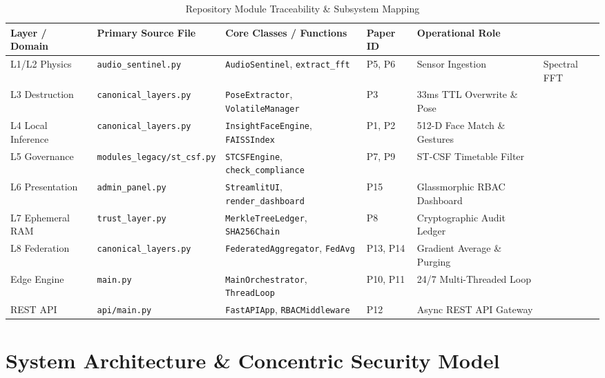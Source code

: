 \documentclass[12pt,a4paper,oneside]{report}
\begin{document}
\begin{table}[htbp]
\caption{Repository Module Traceability & Subsystem Mapping}
\label{tab:codebase_traceability}
\centering
{}
\fontsize{9}{11}\selectfont
\begin{tabular}{@{}lllll@{}}
\toprule
\textbf{Layer / Domain} & \textbf{Primary Source File} & \textbf{Core Classes / Functions} & \textbf{Paper ID} & \textbf{Operational Role} \\
\midrule
L1/L2 Physics & \texttt{audio\_sentinel.py} & \texttt{AudioSentinel}, \texttt{extract\_fft} & P5, P6 & Sensor Ingestion & Spectral FFT \\
L3 Destruction & \texttt{canonical_layers.py} & \texttt{PoseExtractor}, \texttt{VolatileManager} & P3 & 33ms TTL Overwrite \& Pose \\
L4 Local Inference & \texttt{canonical_layers.py} & \texttt{InsightFaceEngine}, \texttt{FAISSIndex} & P1, P2 & 512-D Face Match \& Gestures \\
L5 Governance & \texttt{modules_legacy/st_csf.py} & \texttt{STCSFEngine}, \texttt{check\_compliance} & P7, P9 & ST-CSF Timetable Filter \\
L6 Presentation & \texttt{admin_panel.py} & \texttt{StreamlitUI}, \texttt{render_dashboard} & P15 & Glassmorphic RBAC Dashboard \\
L7 Ephemeral RAM & \texttt{trust_layer.py} & \texttt{MerkleTreeLedger}, \texttt{SHA256Chain} & P8 & Cryptographic Audit Ledger \\
L8 Federation & \texttt{canonical_layers.py} & \texttt{FederatedAggregator}, \texttt{FedAvg} & P13, P14 & Gradient Average \& Purging \\
Edge Engine & \texttt{main.py} & \texttt{MainOrchestrator}, \texttt{ThreadLoop} & P10, P11 & 24/7 Multi-Threaded Loop \\
REST API & \texttt{api/main.py} & \texttt{FastAPIApp}, \texttt{RBACMiddleware} & P12 & Async REST API Gateway \\
\bottomrule
\end{tabular}
\end{table}

\vfill

\chapter{System Architecture \& Concentric Security Model}
\thispagestyle{empty}
\end{document}
